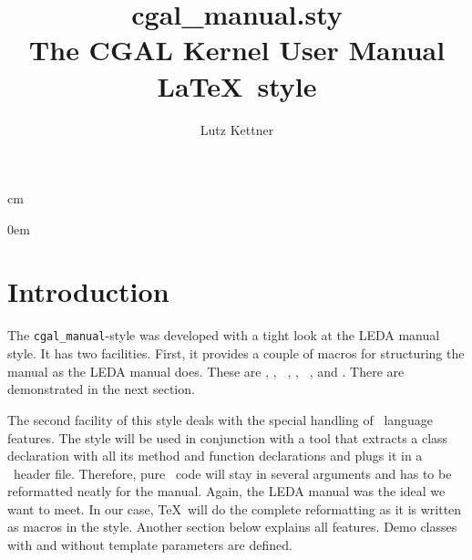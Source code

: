 % 


\textwidth 15.4cm 
 cm
\topmargin -14mm       
\evensidemargin 3mm 
\oddsidemargin 3mm



\parindent0em
\setlength{\parskip}{1ex minus 0.9ex}

\sloppy

\title {cgal\_manual.sty\\
        The CGAL Kernel User Manual \LaTeX\ style\\
        \vspace{5mm}
        \CCrevision}
\author{Lutz Kettner}

\date{\CCdate}



\maketitle

\section{Introduction}

The {\tt cgal\_manual}-style was developed with a tight look at the
LEDA manual style. It has two facilities. First, it provides a couple
of macros for structuring the manual as the LEDA manual does. These
are {\tt \string{}}, {\tt \string\creation}, {\tt
  \string\operations}, {\tt \string\implementation}, {\tt
  \string\example}, and {\tt \string\precond}. There are demonstrated
in the next section.

The second facility of this style deals with the special handling of
\CC\ language features. The style will be used in conjunction with a
tool that extracts a class declaration with all its method and
function declarations and plugs it in a \CC\ header file. Therefore,
pure \CC\ code will stay in several arguments and has to be
reformatted neatly for the manual. Again, the LEDA manual was the
ideal we want to meet. In our case, \TeX\ will do the complete
reformatting as it is written as macros in the style. Another
section below explains all features. Demo classes with and without
template parameters are defined.

